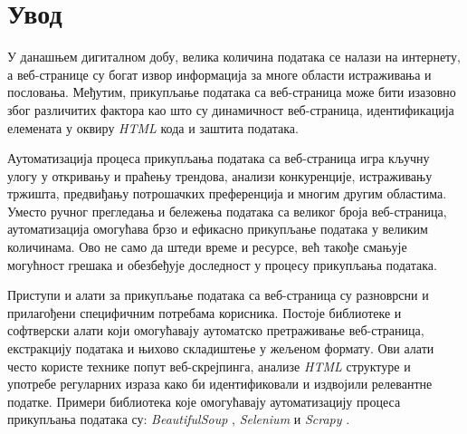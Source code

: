 \documentclass[12pt,oneside]{memoir}
\begin{document}
\frontmatter
\naslovna
\komisija
\apstrakt

\tableofcontents*

\mainmatter

\chapter{Увод}
У данашњем дигиталном добу, велика количина података се налази на интернету, а веб-странице су богат извор информација за многе области истраживања и пословања. Међутим, прикупљање података са веб-страница може бити изазовно због различитих фактора као што су динамичност веб-страница, идентификација елемената у оквиру \textit{HTML} кода и заштита података.

Аутоматизација процеса прикупљања података са веб-страница игра кључну улогу у откривању и праћењу трендова, анализи конкуренције, истраживању тржишта, предвиђању потрошачких преференција и многим другим областима. Уместо ручног прегледања и бележења података са великог броја веб-страница, аутоматизација омогућава брзо и ефикасно прикупљање података у великим количинама. Ово не само да штеди време и ресурсе, већ такође смањује могућност грешака и обезбеђује доследност у процесу прикупљања података.

Приступи и алати за прикупљање података са веб-страница су разноврсни и прилагођени специфичним потребама корисника. Постоје библиотеке и софтверски алати који омогућавају аутоматско претраживање веб-страница, екстракцију података и њихово складиштење у жељеном формату. Ови алати често користе технике попут веб-скрејпинга, анализе \textit{HTML} структуре и употребе регуларних израза како би идентификовали и издвојили релевантне податке. Примери библиотека које омогућавају аутоматизацију процеса
прикупљања података су: \textit{BeautifulSoup} \cite{beautifulSoapDocs}, \textit{Selenium} 
 \cite{selenium} и \textit{Scrapy} \cite{scrapy}.
\end{document}
